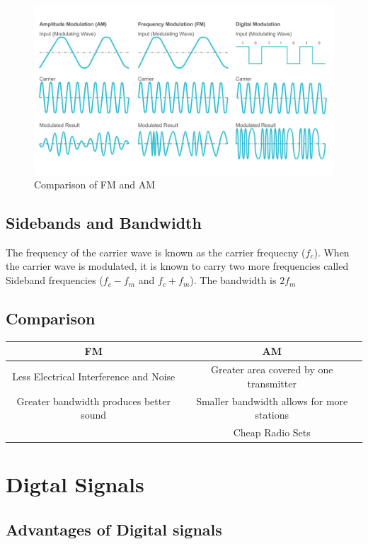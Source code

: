 \documentclass{scrbook}
\begin{document}
	\begin{figure}[t]
		\caption{Comparison of FM and AM \cite{taitra}}
		\label{fmamcomp}
		\includegraphics[width=\linewidth]{assets/fmam.png}
	\end{figure}

\subsection{Sidebands and Bandwidth}

	The frequency of the carrier wave is known as the carrier frequecny ($f_c$). When the carrier wave is modulated, it is known to carry two more frequencies called Sideband frequencies ($f_c - f_m$ and $f_c + f_m$). The bandwidth is $2f_m$

\subsection{Comparison}

	\begin{tabular}{| c | c |}
		\hline
		FM & AM \\
		\hline
		Less Electrical Interference and Noise & Greater area covered by one transmitter \\
		Greater bandwidth produces better sound & Smaller bandwidth allows for more stations \\
		& Cheap Radio Sets \\
		\hline
	\end{tabular}

\section{Digtal Signals}

\subsection{Advantages of Digital signals}
\end{document}
